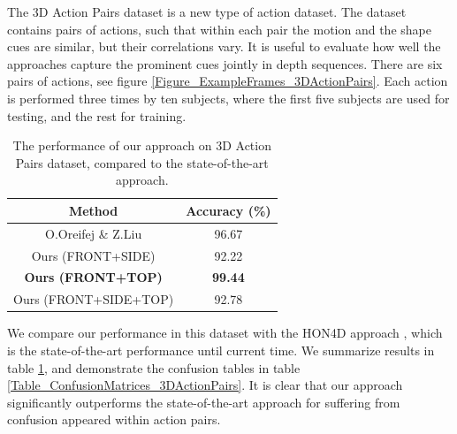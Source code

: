 \documentclass[final,3p,times,twocolumn]{elsarticle}
\begin{document}
The 3D Action Pairs dataset \cite{oreifej2013hon4d} is a new type of action dataset.
The dataset contains pairs of actions, such that within each pair the motion and the shape cues are similar, but their correlations vary.
It is useful to evaluate how well the approaches capture the prominent cues jointly in depth sequences.
There are six pairs of actions, see figure \ref{Figure_ExampleFrames_3DActionPairs}.
Each action is performed three times by ten subjects, where the first five subjects are used for testing, and the rest for training.

\begin{table}[H]
	\begin{tabular}{c|c}	
		    \bf Method & \bf Accuracy (\%) \\
		\hline
		O.Oreifej \& Z.Liu \cite{oreifej2013hon4d}&      96.67 \\
		\hline
		Ours (FRONT+SIDE) &      92.22 \\
		
		\bf Ours (FRONT+TOP) &      \bf 99.44 \\
		
		Ours (FRONT+SIDE+TOP) &      92.78 \\
	
	\end{tabular}  
	
	\caption{The performance of our approach on 3D Action Pairs dataset, compared to the state-of-the-art approach.}
	\label{Table_3DActionPairs_SoA}
\end{table}

We compare our performance in this dataset with the HON4D approach \cite{oreifej2013hon4d}, which is the state-of-the-art performance until current time.
We summarize results in table \ref{Table_3DActionPairs_SoA}, and demonstrate the confusion tables in table \ref{Table_ConfusionMatrices_3DActionPairs}.
It is clear that our approach significantly outperforms the state-of-the-art approach for suffering from confusion appeared within action pairs.
\end{document}

